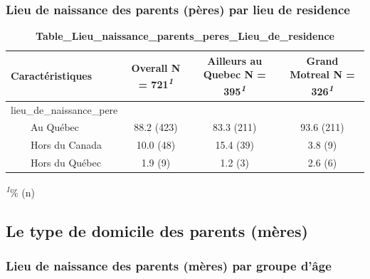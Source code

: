 \documentclass[
]{article}
\begin{document}
\hypertarget{lieu-de-naissance-des-parents-puxe8res-par-lieu-de-residence}{%
\subsubsection{Lieu de naissance des parents (pères) par lieu de
residence}\label{lieu-de-naissance-des-parents-puxe8res-par-lieu-de-residence}}

\newpage
\begin{table}[!t]
\caption{\label{tab:unnamed-chunk-34}\textbf{Table\_Lieu\_naissance\_parents\_peres\_Lieu\_de\_residence}} 
\fontsize{12.0pt}{14.4pt}\selectfont
\begin{tabular*}{\linewidth}{@{\extracolsep{\fill}}lccc}
\toprule
\textbf{Caractéristiques} & \textbf{Overall}  N = 721\textsuperscript{\textit{1}} & \textbf{Ailleurs au Quebec}  N = 395\textsuperscript{\textit{1}} & \textbf{Grand Motreal}  N = 326\textsuperscript{\textit{1}} \\ 
\midrule\addlinespace[2.5pt]
lieu\_de\_naissance\_pere &  &  &  \\ 
    Au Québec & 88.2 (423) & 83.3 (211) & 93.6 (211) \\ 
    Hors du Canada & 10.0 (48) & 15.4 (39) & 3.8 (9) \\ 
    Hors du Québec & 1.9 (9) & 1.2 (3) & 2.6 (6) \\ 
\bottomrule
\end{tabular*}
\begin{minipage}{\linewidth}
\textsuperscript{\textit{1}}\% (n)\\
\end{minipage}
\end{table}
\vspace{1cm}

\hypertarget{le-type-de-domicile-des-parents-muxe8res}{%
\subsection{Le type de domicile des parents
(mères)}\label{le-type-de-domicile-des-parents-muxe8res}}

\vspace{1cm}

\hypertarget{lieu-de-naissance-des-parents-muxe8res-par-groupe-duxe2ge-1}{%
\subsubsection{Lieu de naissance des parents (mères) par groupe
d'âge}\label{lieu-de-naissance-des-parents-muxe8res-par-groupe-duxe2ge-1}}
\end{document}
